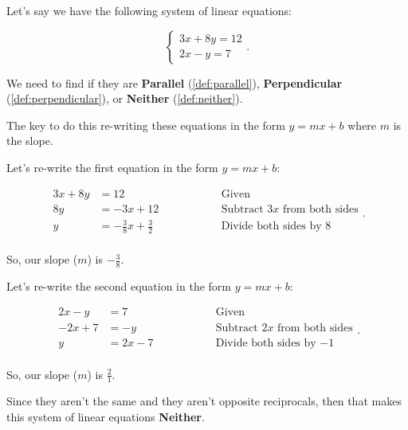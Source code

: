 \begin{example}
  \label{exm:identifying_if_an_equation_is_parallel_perpendicular_or_neither_3}

  Let's say we have the following system of linear equations:

  \begin{equation}
    \label{cse:system_of_linear_equations_3}
    \begin{cases}
      3x + 8y = 12 \\
      2x - y = 7
    \end{cases}
  .\end{equation}

  We need to find if they are \textbf{Parallel} (\ref{def:parallel}),
  \textbf{Perpendicular} (\ref{def:perpendicular}), or \textbf{Neither}
  (\ref{def:neither}).
  
  The key to do this re-writing these equations in the form $y = mx + b$ where $m$
  is the slope.
  
  Let's re-write the first equation in the form $y = mx + b$:

  \begin{equation}
    \label{edt:re_writing_the_first_equation_in_the_form_y_mx_b_3}
    \begin{alignedat}{3}
      3x + 8y &= 12 \qquad\qquad && \textrm{Given} \\
      8y &= -3x + 12 \qquad\qquad && \textrm{Subtract $3x$ from both sides} \\
      y &= -\frac{3}{8}x + \frac{3}{2} \qquad\qquad && \textrm{Divide both sides by $8$} \\
    \end{alignedat}
  .\end{equation}

  So, our slope ($m$) is $-\frac{3}{8}$.

  Let's re-write the second equation in the form $y = mx + b$:

  \begin{equation}
    \label{edt:re_writing_the_second_equation_in_the_form_y_mx_b}
    \begin{alignedat}{3}
      2x - y &= 7 \qquad\qquad && \textrm{Given} \\
      -2x + 7 &= -y \qquad\qquad && \textrm{Subtract $2x$ from both sides} \\
      y &= 2x - 7 \qquad\qquad && \textrm{Divide both sides by $-1$} \\
    \end{alignedat}
  .\end{equation}

  So, our slope ($m$) is $\frac{2}{1}$.

  Since they aren't the same and they aren't opposite reciprocals, then that
  makes this system of linear equations \textbf{Neither}.
\end{example}

\newpage
